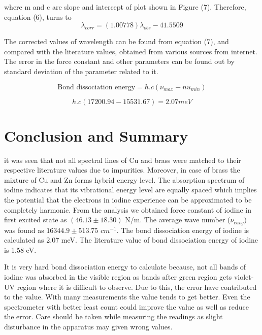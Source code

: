 \documentclass[a4paper, amsfonts, amssymb, amsmath, reprint, showkeys, nofootinbib, twoside]{revtex4-1}
\begin{document}
where m and c are slope and intercept of plot shown in Figure (7). Therefore, equation (6), turns to 
\begin{equation}
	\lambda_{corr}=(1.00778)\lambda_{obs}-41.5509
\end{equation}

The corrected values of wavelength can be found from equation (7), and compared with the literature values, obtained from various sources from internet. The error in the force constant and other parameters can be found out by standard deviation of the parameter related to it. 

\begin{equation}
	\text{Bond dissociation energy}=h.c(\nu_{max}-nu_{min})
\end{equation}

\begin{equation}
	h.c(17200.94-15531.67)=2.07 meV
\end{equation}

\section{Conclusion and Summary}
 it was seen that not all spectral lines of Cu and brass were matched to their respective literature values due to impurities. Moreover, in case of brass the mixture of Cu and Zn forms hybrid energy level. The absorption spectrum of iodine indicates that its vibrational energy level are equally spaced which implies the potential
 that the electrons in iodine experience can be approximated to be completely harmonic. 
 From the analysis we obtained force constant of iodine in first excited state as $(46.13\pm18.30)$ N/m. The average wave number ($\nu_{e avg})$ was found as $16344.9\pm513.75$ $cm^{-1}$. The bond dissociation energy of iodine is calculated as 2.07 meV. The literature value of bond dissociation energy of iodine is 1.58 eV. 

It is very hard bond dissociation energy to calculate because, not all bands of iodine was absorbed in the visible region as bands after green region gets violet-UV region where it is difficult to observe. Due to this, the error have contributed to the value. With many measurements the value tends to get better. Even the spectrometer with better least count could improve the value as well as reduce the error. Care should be taken while measuring the readings as slight disturbance in the apparatus may given wrong values. 
\end{document}
